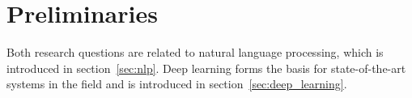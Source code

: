 \clearemptydoublepage

\chapter{Preliminaries}
\label{ch:preliminaries}

Both research questions are related to natural language processing, which is introduced in section~\ref{sec:nlp}.
Deep learning forms the basis for state-of-the-art systems in the field and is introduced in section~\ref{sec:deep_learning}.




